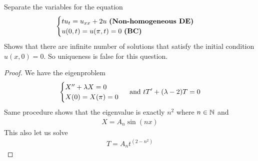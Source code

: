 \documentclass{report}
\begin{document}
\begin{question}{}{}
Separate the variables for the equation 
\begin{align*}
\begin{cases}
  tu_t=u_{xx}+2u\text{ \textbf{(Non-homogeneous DE)} }\\
  u(0,t)=u(\pi ,t)=0\text{ \textbf{(BC)} }
\end{cases}
\end{align*}
Shows that there are infinite number of solutions that satisfy the initial condition $u(x,0)=0$. So uniqueness is false for this question. 
\end{question}
\begin{proof}
We have the eigenproblem 
\begin{align*}
\begin{cases}
  X''+\lambda X=0\\
  X(0)=X(\pi )=0
\end{cases}\text{ and }tT'+ (\lambda -2)T=0
\end{align*}
Same procedure shows that the eigenvalue is exactly $n^2$ where $n\in\mathbb{N}$ and 
\begin{align*}
X= A_n \sin (nx)
\end{align*}
This also let us solve 
\begin{align*}
T=A_n t^{(2-n^2)}
\end{align*}
\end{proof}
\end{document}

